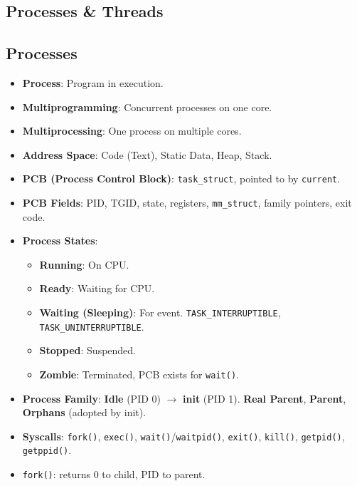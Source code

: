 \documentclass[8pt,a4paper]{article}
\begin{document}
\begin{multicols}{2}
\section*{Processes \& Threads}
\subsection*{Processes}
\begin{itemize}
    \item \textbf{Process}: Program in execution.
    \item \textbf{Multiprogramming}: Concurrent processes on one core.
    \item \textbf{Multiprocessing}: One process on multiple cores.
    \item \textbf{Address Space}: Code (Text), Static Data, Heap, Stack.
    \item \textbf{PCB (Process Control Block)}: \texttt{task\_struct}, pointed to by \texttt{current}.
    \item \textbf{PCB Fields}: PID, TGID, state, registers, \texttt{mm\_struct}, family pointers, exit code.
    \item \textbf{Process States}:
    \begin{itemize}
        \item \textbf{Running}: On CPU.
        \item \textbf{Ready}: Waiting for CPU.
        \item \textbf{Waiting (Sleeping)}: For event. \texttt{TASK\_INTERRUPTIBLE}, \texttt{TASK\_UNINTERRUPTIBLE}.
        \item \textbf{Stopped}: Suspended.
        \item \textbf{Zombie}: Terminated, PCB exists for \texttt{wait()}.
    \end{itemize}
    \item \textbf{Process Family}: \textbf{Idle} (PID 0) $\to$ \textbf{init} (PID 1). \textbf{Real Parent}, \textbf{Parent}, \textbf{Orphans} (adopted by init).
    \item \textbf{Syscalls}: \texttt{fork()}, \texttt{exec()}, \texttt{wait()}/\texttt{waitpid()}, \texttt{exit()}, \texttt{kill()}, \texttt{getpid()}, \texttt{getppid()}.
    \item \texttt{fork()}: returns 0 to child, PID to parent.
\end{itemize}


\end{multicols}
\end{document}

